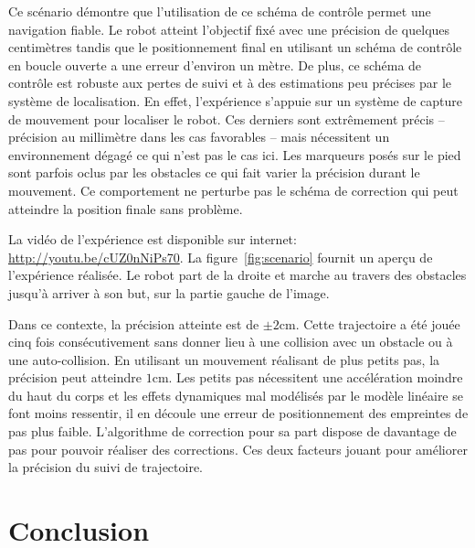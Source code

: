 Ce scénario démontre que l'utilisation de ce schéma de contrôle permet
une navigation fiable. Le robot atteint l'objectif fixé avec une
précision de quelques centimètres tandis que le positionnement final
en utilisant un schéma de contrôle en boucle ouverte a une erreur
d'environ un mètre. De plus, ce schéma de contrôle est robuste aux
pertes de suivi et à des estimations peu précises par le système de
localisation. En effet, l'expérience s'appuie sur un système de
capture de mouvement pour localiser le robot. Ces derniers sont
extrêmement précis -- précision au millimètre dans les cas favorables
-- mais nécessitent un environnement dégagé ce qui n'est pas le cas
ici. Les marqueurs posés sur le pied sont parfois oclus par les
obstacles ce qui fait varier la précision durant le mouvement. Ce
comportement ne perturbe pas le schéma de correction qui peut
atteindre la position finale sans problème.


La vidéo de l'expérience est disponible sur internet:
\mbox{\url{http://youtu.be/cUZ0nNiPs70}}. La figure~\ref{fig:scenario}
fournit un aperçu de l'expérience réalisée. Le robot part de la droite
et marche au travers des obstacles jusqu'à arriver à son but, sur la
partie gauche de l'image.

Dans ce contexte, la précision atteinte est de $\pm 2
\mathrm{cm}$. Cette trajectoire a été jouée cinq fois consécutivement
sans donner lieu à une collision avec un obstacle ou à une
auto-collision. En utilisant un mouvement réalisant de plus petits
pas, la précision peut atteindre $1 \mathrm{cm}$. Les petits pas
nécessitent une accélération moindre du haut du corps et les effets
dynamiques mal modélisés par le modèle linéaire se font moins
ressentir, il en découle une erreur de positionnement des empreintes
de pas plus faible. L'algorithme de correction pour sa part dispose de
davantage de pas pour pouvoir réaliser des corrections. Ces deux
facteurs jouant pour améliorer la précision du suivi de trajectoire.


\section{Conclusion}\label{conclusion}


